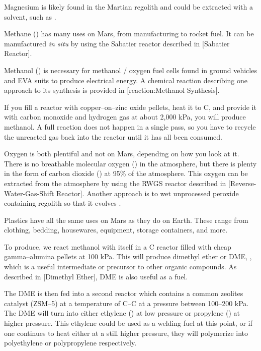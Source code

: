Magnesium is likely found in the Martian regolith and could be extracted with a solvent, such as .

Methane () has many uses on Mars, from manufacturing to rocket fuel. It can be manufactured {\it in situ} by using the Sabatier reactor described in [Sabatier Reactor].

Methanol () is necessary for methanol / oxygen fuel cells found in ground vehicles and EVA suits to produce electrical energy. A chemical reaction describing one approach to its synthesis is provided in [reaction:Methanol Synthesis].

\startformula
{}
\stopformula

If you fill a reactor with copper--on--zinc oxide pellets, heat it to C, and provide it with carbon monoxide and hydrogen gas at about 2,000 kPa, you will produce methanol. A full reaction does not happen in a single pass, so you have to recycle the unreacted gas back into the reactor until it has all been consumed.

Oxygen is both plentiful and not on Mars, depending on how you look at it. There is no breathable molecular oxygen () in the atmosphere, but there is plenty in the form of carbon dioxide () at 95\% of the atmosphere. This oxygen can be extracted from the atmosphere by using the RWGS reactor described in [Reverse-Water-Gas-Shift Reactor]. Another approach is to wet unprocessed peroxide containing regolith so that it evolves .

Plastics have all the same uses on Mars as they do on Earth. These range from clothing, bedding, housewares, equipment, storage containers, and more.

To produce, we react methanol with itself in a C reactor filled with cheap gamma--alumina pellets at 100 kPa. This will produce dimethyl ether or DME, , which is a useful intermediate or precursor to other organic compounds. As described in [Dimethyl Ether], DME is also useful as a fuel.

The DME is then fed into a second reactor which contains a common zeolites catalyst (ZSM--5) at a temperature of C--C at a pressure between 100--200 kPa. The DME will turn into either ethylene () at low pressure or propylene () at higher pressure. This ethylene could be used as a welding fuel at this point, or if one continues to heat either at a still higher pressure, they will polymerize into polyethylene or polypropylene respectively.

